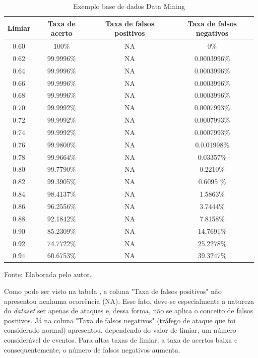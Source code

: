  \begin{table}[htb]
 	\centering
 	\begin{threeparttable}
 		\caption{Exemplo base de dados Data Mining}
 		\label{Tab:ResultsMining}
 		\begin{tabular}{c c c c}
 			\toprule
 			\textbf{Limiar} & \textbf{Taxa de acerto} & \textbf{Taxa de falsos positivos} & \textbf{Taxa de falsos negativos}
 			\\ \midrule
	 			
 			0.60 &  100\% &  NA& 0\%   \\ \midrule
 			0.62 &  99.9996\% &  NA& 0.0003996\%   \\ \midrule
 			0.64 &  99.9996\% &  NA& 0.0003996\%   \\ \midrule
 			0.66 &  99.9996\% &  NA& 0.0003996\%   \\ \midrule
 			0.68 &  99.9996\% &  NA& 0.0003996\%   \\ \midrule
 			0.70 &  99.9992\% &  NA& 0.0007993\%   \\ \midrule
 			0.72 &  99.9992\% &  NA& 0.0007993\%   \\ \midrule
 			0.74 &  99.9992\% &  NA& 0.0007993\%   \\ \midrule
 			0.76 &  99.9800\% &  NA& 0.0.01998\%   \\ \midrule
 			0.78 &  99.9664\% &  NA& 0.03357\%   \\\midrule 		 			 			 			 			 			 			 			
 			0.80 &  99.7790\% &  NA& 0.2210\%   \\ \midrule
 			0.82 &  99.3905\% & NA & 0.6095 \%   \\ \midrule
 			0.84 &  98.4137\%  & NA & 1.5863\%   \\ \midrule
 			0.86 &  96.2556\%  &  NA & 3.7444\%   \\ \midrule
 			0.88 &  92.1842\%  &  NA & 7.8158\%     \\ \midrule
 			0.90 &  85.2309\%  & NA & 14.7691\%    \\ \midrule
 			0.92 &  74.7722\%  &  NA & 25.2278\%   \\ \midrule
 			0.94 &  60.6753\%  & NA & 39.3247\%   \\ \bottomrule
 		\end{tabular}
 		{Fonte: Elaborada pelo autor.}
 	\end{threeparttable}
 \end{table}
Como pode ser visto na tabela , a coluna "Taxa de falsos positivos" não apresentou nenhuma ocorrência (NA). Esse fato, deve-se especialmente a natureza do \textit{dataset} ser apenas de ataques e, dessa forma, não se aplica o conceito de falsos positivos. Já na coluna "Taxa de falsos negativos" (tráfego de ataque que foi considerado normal) apresentou, dependendo do valor de limiar, um número considerável de eventos. Para altas taxas de limiar, a taxa de acertos baixa e consequentemente, o número de falsos negativos aumenta. 
